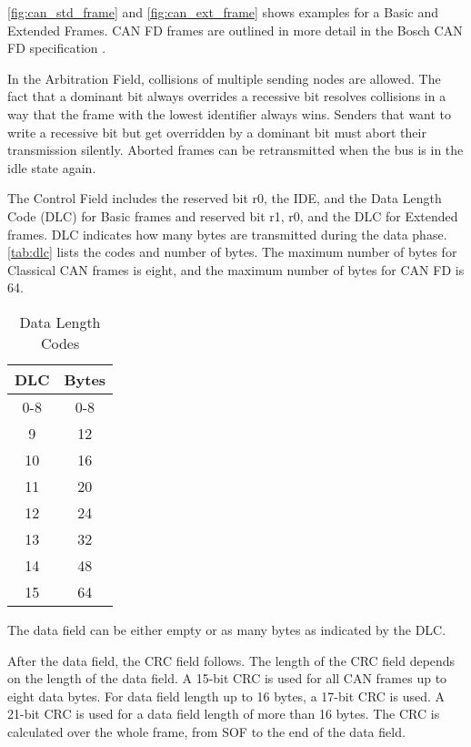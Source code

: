 


\autoref{fig:can_std_frame} and \autoref{fig:can_ext_frame} shows examples for a Basic and Extended Frames.
CAN FD frames are outlined in more detail in the Bosch CAN FD specification \cite{BoschCANFD}.

In the Arbitration Field, collisions of multiple sending nodes are allowed.
The fact that a dominant bit always overrides a recessive bit resolves collisions in a way that the frame with the lowest identifier always wins.
Senders that want to write a recessive bit but get overridden by a dominant bit must abort their transmission silently.
Aborted frames can be retransmitted when the bus is in the idle state again.

The Control Field includes the reserved bit r0, the IDE, and the Data Length Code (DLC) for Basic frames and reserved bit r1, r0, and the DLC for Extended frames.
DLC indicates how many bytes are transmitted during the data phase.
\autoref{tab:dlc} lists the codes and number of bytes.
The maximum number of bytes for Classical CAN frames is eight, and the maximum number of bytes for CAN FD is 64.

\begin{table}
	\centering
	\caption{Data Length Codes}
	\begin{tabular}{|c|c|} 
		\hline
		DLC & Bytes \\
		\hline
		\hline
		0-8 & 0-8 \\ \hline
		9   & 12  \\ \hline
		10  & 16  \\ \hline
		11  & 20  \\ \hline
		12  & 24  \\ \hline
		13  & 32  \\ \hline
		14  & 48  \\ \hline
		15  & 64  \\ \hline
	\end{tabular}
	\label{tab:dlc}
\end{table}

The data field can be either empty or as many bytes as indicated by the DLC.

After the data field, the CRC field follows.
The length of the CRC field depends on the length of the data field.
A 15-bit CRC is used for all CAN frames up to eight data bytes.
For data field length up to 16 bytes, a 17-bit CRC is used.
A 21-bit CRC is used for a data field length of more than 16 bytes.
The CRC is calculated over the whole frame, from SOF to the end of the data field.


